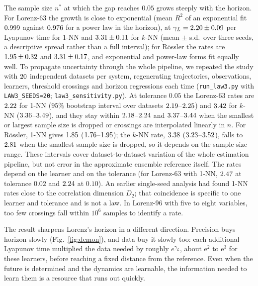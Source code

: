 \documentclass[journal]{IEEEtran}
\theoremstyle{definition}
\begin{document}
The sample size $n^*$ at which the gap reaches $0.05$ grows steeply with the horizon. For Lorenz-63 the growth is close to exponential (mean $R^2$ of an exponential fit $0.999$ against $0.976$ for a power law in the horizon), at $\gamma_L=2.20\pm0.09$ per Lyapunov time for 1-NN and $3.31\pm0.11$ for $k$-NN (mean $\pm$ s.d.\ over three seeds, a descriptive spread rather than a full interval); for R\"ossler the rates are $1.95\pm0.32$ and $3.31\pm0.17$, and exponential and power-law forms fit equally well. To propagate uncertainty through the whole pipeline, we repeated the study with $20$ independent datasets per system, regenerating trajectories, observations, learners, threshold crossings and horizon regressions each time (\texttt{run\_law3.py} with \texttt{LAW3\_SEEDS=20}; \texttt{law3\_sensitivity.py}). At tolerance $0.05$ the Lorenz-63 rates are $2.22$ for 1-NN ($95\%$ bootstrap interval over datasets $2.19$--$2.25$) and $3.42$ for $k$-NN ($3.36$--$3.49$), and they stay within $2.18$--$2.24$ and $3.37$--$3.44$ when the smallest or largest sample size is dropped or crossings are interpolated linearly in $n$. For R\"ossler, 1-NN gives $1.85$ ($1.76$--$1.95$); the $k$-NN rate, $3.38$ ($3.23$--$3.52$), falls to $2.81$ when the smallest sample size is dropped, so it depends on the sample-size range. These intervals cover dataset-to-dataset variation of the whole estimation pipeline, but not error in the approximate ensemble reference itself. The rates depend on the learner and on the tolerance (for Lorenz-63 with 1-NN, $2.47$ at tolerance $0.02$ and $2.24$ at $0.10$). An earlier single-seed analysis had found 1-NN rates close to the correlation dimension $D_2$; that coincidence is specific to one learner and tolerance and is not a law. In Lorenz-96 with five to eight variables, too few crossings fall within $10^6$ samples to identify a rate.

The result sharpens Lorenz's horizon in a different direction. Precision buys horizon slowly (Fig.~\ref{fig:demon}), and data buy it slowly too: each additional Lyapunov time multiplied the data needed by roughly $e^{\gamma_L}$, about $\mathrm{e}^{2}$ to $\mathrm{e}^{3}$ for these learners, before reaching a fixed distance from the reference. Even when the future is determined and the dynamics are learnable, the information needed to learn them is a resource that runs out quickly.
\end{document}
